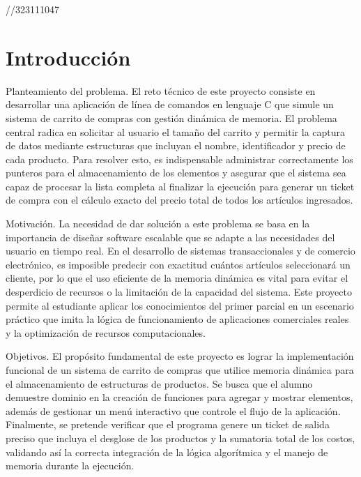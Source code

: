 //323111047


\section{Introducción}

Planteamiento del problema. El reto técnico de este proyecto consiste en desarrollar una aplicación de línea de comandos en lenguaje C que simule un sistema de carrito de compras con gestión dinámica de memoria. El problema central radica en solicitar al usuario el tamaño del carrito y permitir la captura de datos mediante estructuras que incluyan el nombre, identificador y precio de cada producto. Para resolver esto, es indispensable administrar correctamente los punteros para el almacenamiento de los elementos y asegurar que el sistema sea capaz de procesar la lista completa al finalizar la ejecución para generar un ticket de compra con el cálculo exacto del precio total de todos los artículos ingresados.

\vspace{0.4cm}

Motivación. La necesidad de dar solución a este problema se basa en la importancia de diseñar software escalable que se adapte a las necesidades del usuario en tiempo real. En el desarrollo de sistemas transaccionales y de comercio electrónico, es imposible predecir con exactitud cuántos artículos seleccionará un cliente, por lo que el uso eficiente de la memoria dinámica es vital para evitar el desperdicio de recursos o la limitación de la capacidad del sistema. Este proyecto permite al estudiante aplicar los conocimientos del primer parcial en un escenario práctico que imita la lógica de funcionamiento de aplicaciones comerciales reales y la optimización de recursos computacionales.

\vspace{0.4cm}

Objetivos. El propósito fundamental de este proyecto es lograr la implementación funcional de un sistema de carrito de compras que utilice memoria dinámica para el almacenamiento de estructuras de productos. Se busca que el alumno demuestre dominio en la creación de funciones para agregar y mostrar elementos, además de gestionar un menú interactivo que controle el flujo de la aplicación. Finalmente, se pretende verificar que el programa genere un ticket de salida preciso que incluya el desglose de los productos y la sumatoria total de los costos, validando así la correcta integración de la lógica algorítmica y el manejo de memoria durante la ejecución.